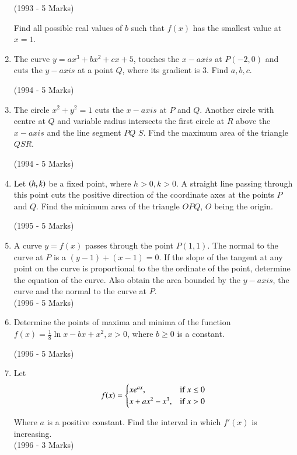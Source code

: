 \documentclass[journal,12pt,twocolumn]{IEEEtran}
\theoremstyle{remark}
\begin{document}
\begin{enumerate}
\hfill (1993 - 5 Marks)

Find all possible real values of $b$ such that $f(x)$ has the smallest value at $x=1$.

\item The curve $y = ax^3 + bx^2 + cx + 5$, touches the $x-axis$ at $P(-2,0)$ and cuts the $y-axis$ at a point $Q$, where its gradient is 3. Find $a, b, c$.

\hfill (1994 - 5 Marks)

\item The circle $x^2 + y^2 = 1$ cuts the $x-axis$ at $P$ and $Q$. Another circle with centre at $Q$ and variable radius intersects the first circle at $R$ above the $x-axis$ and the line segment $PQ$ $S$. Find the maximum area of the triangle $QSR$.

\hfill (1994 - 5 Marks)


\item Let $\left(h,k\right)$ be a fixed point, where $h>0, k>0$. A straight line passing through this point cuts the positive direction of the coordinate axes at the points $P$ and $Q$. Find the minimum area of the triangle $OPQ$, $O$ being the origin.

\hfill{(1995 - 5 Marks)}


\item A curve $y=f(x)$ passes through the point $P(1,1)$. The normal to the curve at $P$ is a $(y-1) + (x-1) = 0$. If the slope of the tangent at any point on the curve is proportional to the the ordinate of the point, determine the equation of the curve. Also obtain the area bounded by the $y-axis$, the curve and the normal to the curve at $P$.\\
\hfill (1996 - 5 Marks)

\item Determine the points of maxima and minima of the function $f(x) = \frac{1}{8}\ln{x} - bx + x^2, x>0$, where $b \geq 0$ is a constant.

\hfill (1996 - 5 Marks)


\item Let 
\[ f(x) = \begin{cases}
xe^{ax}, & \text{if } x \leq 0\\
x+ax^2 - x^3, & \text{if } x > 0
\end{cases}\\
\]

Where $a$ is a positive constant. Find the interval in which $f'(x)$ is increasing.\\
\hfill (1996 - 3 Marks)


\end{enumerate}
\end{document}
